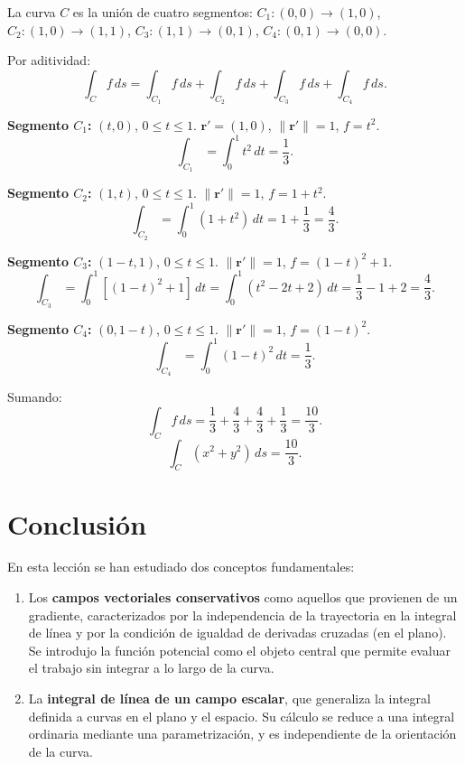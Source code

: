 \begin{myproof}
La curva \(C\) es la unión de cuatro segmentos:
\(C_1: (0,0)\to(1,0)\), \(C_2: (1,0)\to(1,1)\),
\(C_3: (1,1)\to(0,1)\), \(C_4: (0,1)\to(0,0)\).

Por aditividad:
\[
\int_C f\,ds = \int_{C_1} f\,ds + \int_{C_2} f\,ds
+ \int_{C_3} f\,ds + \int_{C_4} f\,ds.
\]

\textbf{Segmento \(C_1\):} \((t,0)\), \(0\le t\le 1\).
\(\mathbf{r}'=(1,0)\), \(\|\mathbf{r}'\|=1\), \(f=t^2\).
\[
\int_{C_1} = \int_0^1 t^2\,dt = \frac{1}{3}.
\]

\textbf{Segmento \(C_2\):} \((1,t)\), \(0\le t\le 1\).
\(\|\mathbf{r}'\|=1\), \(f=1+t^2\).
\[
\int_{C_2} = \int_0^1 (1+t^2)\,dt = 1 + \frac{1}{3} = \frac{4}{3}.
\]

\textbf{Segmento \(C_3\):} \((1-t,1)\), \(0\le t\le 1\).
\(\|\mathbf{r}'\|=1\), \(f=(1-t)^2+1\).
\[
\int_{C_3} = \int_0^1 [(1-t)^2 + 1]\,dt
= \int_0^1 (t^2 - 2t + 2)\,dt
= \frac{1}{3} - 1 + 2 = \frac{4}{3}.
\]

\textbf{Segmento \(C_4\):} \((0,1-t)\), \(0\le t\le 1\).
\(\|\mathbf{r}'\|=1\), \(f=(1-t)^2\).
\[
\int_{C_4} = \int_0^1 (1-t)^2\,dt = \frac{1}{3}.
\]

Sumando:
\[
\int_C f\,ds = \frac{1}{3} + \frac{4}{3} + \frac{4}{3} + \frac{1}{3}
= \frac{10}{3}.
\]
\[
\boxed{\int_C (x^2+y^2)\,ds = \frac{10}{3}}.
\]
\end{myproof}

\section*{Conclusión}

En esta lección se han estudiado dos conceptos fundamentales:

\begin{enumerate}
  \item Los \textbf{campos vectoriales conservativos} como aquellos que
  provienen de un gradiente, caracterizados por la independencia de la
  trayectoria en la integral de línea y por la condición de igualdad
  de derivadas cruzadas (en el plano). Se introdujo la función
  potencial como el objeto central que permite evaluar el trabajo sin
  integrar a lo largo de la curva.

  \item La \textbf{integral de línea de un campo escalar}, que
  generaliza la integral definida a curvas en el plano y el espacio.
  Su cálculo se reduce a una integral ordinaria mediante una
  parametrización, y es independiente de la orientación de la curva.
\end{enumerate}

